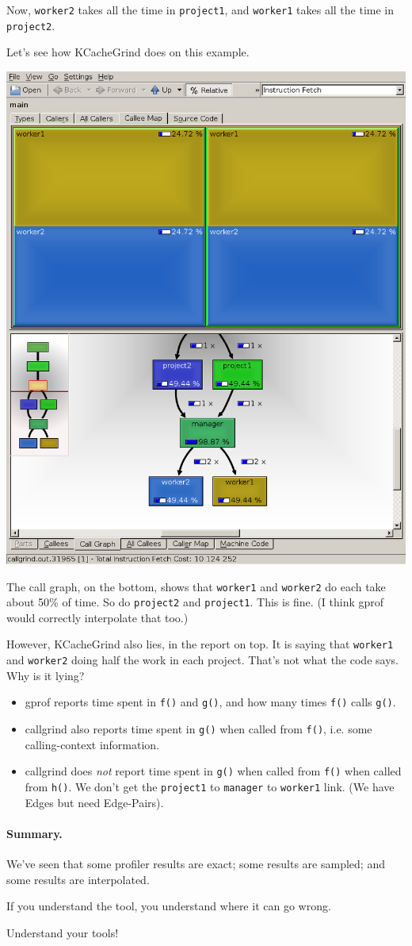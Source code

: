 Now, {\tt worker2} takes all the time in {\tt project1},
and {\tt worker1} takes all the time in {\tt project2}.

Let's see how KCacheGrind does on this example.

\begin{center}
  \includegraphics[width=.25\textwidth]{images/kcachegrind2}
\end{center}


The call graph, on the bottom, shows that 
{\tt worker1} and {\tt worker2} do each take about 50\% of time.
So do {\tt project2} and {\tt project1}. This is fine.
(I think gprof would correctly interpolate that too.)

However, KCacheGrind also lies, in the report on top. It is saying
that {\tt worker1} and {\tt worker2} doing half the work in each
project.  That's not what the code says. Why is it lying?

\begin{itemize}
\item gprof reports time spent in {\tt f()} and {\tt g()},
and how many times {\tt f()} calls {\tt g()}.
\item callgrind also reports 
time spent  in {\tt g()} when called from {\tt f()}, i.e. some calling-context information.
\item callgrind does \emph{not} report time spent in {\tt g()} when
     called from {\tt f()} when called from {\tt h()}.
     We don't get the {\tt project1} to {\tt manager} to {\tt worker1} link.
     (We have Edges but need Edge-Pairs).
\end{itemize}

\paragraph{Summary.} We've seen that some profiler results are exact;
some results are sampled; and some results are interpolated.

If you understand the tool, you understand where it can go
wrong.

Understand your tools!

